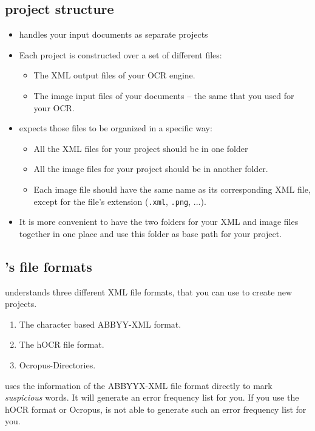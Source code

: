 \subsection{\pocoto{} project structure}
\begin{frame}
	\begin{itemize}
		\item \pocoto{} handles your input documents as separate projects
		\item Each project is constructed over a set of different files:
			\begin{itemize}
				\item The XML output files of your OCR engine.
				\item The image input files of your documents -- the same that you
					used for your OCR.
			\end{itemize}
		\item \pocoto{} expects those files to be organized in a specific way:
			\begin{itemize}
				\item All the XML files for your project should be in one folder
				\item All the image files for your project should be in another
					folder.
				\item Each image file should have the same name as its corresponding
					XML
					file, except for the file's extension (\texttt{.xml},
					\texttt{.png}, ...).
			\end{itemize}
		\item It is more convenient to have the two folders for your XML and image
			files together in one place and use this folder as base path for
			your project.
	\end{itemize}
\end{frame}

\subsection{\pocoto{}'s file formats}
\begin{frame}
	\pocoto{} understands three different XML file formats, that you can use
	to create new projects.
	\begin{enumerate}
		\item The character based ABBYY-XML format.
		\item The hOCR file format.
		\item Ocropus-Directories.
	\end{enumerate}
	\pocoto{} uses the information of the ABBYYX-XML file format directly to mark
	\emph{suspicious} words. It will generate an error frequency list for you. If
	you use the hOCR format or Ocropus, \pocoto{} is not able to generate such an
	error frequency list for you.
\end{frame}

